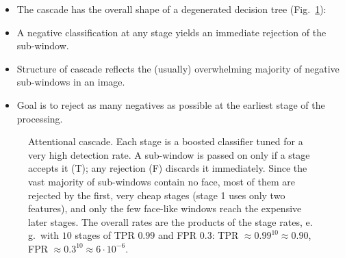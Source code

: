   \begin{itemize}
    \item The cascade has the overall shape of a degenerated decision tree (Fig.~\ref{fig:vj_cascade}):         
    \item A negative classification at any stage yields an immediate rejection of the sub-window.
    \item Structure of cascade reflects the (usually) overwhelming majority of negative sub-windows in an image. %
    \item Goal is to reject as many negatives as possible at the earliest stage of the processing.
  \end{itemize}

  \begin{figure}[htbp]
    \centering
    \caption{Attentional cascade. Each stage is a boosted classifier tuned for a very high detection rate. A sub-window is passed on only if a stage accepts it (T); any rejection (F) discards it immediately. Since the vast majority of sub-windows contain no face, most of them are rejected by the first, very cheap stages (stage 1 uses only two features), and only the few face-like windows reach the expensive later stages. The overall rates are the products of the stage rates, e.\,g.\ with $10$ stages of TPR $0.99$ and FPR $0.3$: TPR $\approx0.99^{10}\approx0.90$, FPR $\approx0.3^{10}\approx6\cdot10^{-6}$.}
    \label{fig:vj_cascade}
  \end{figure}
  
